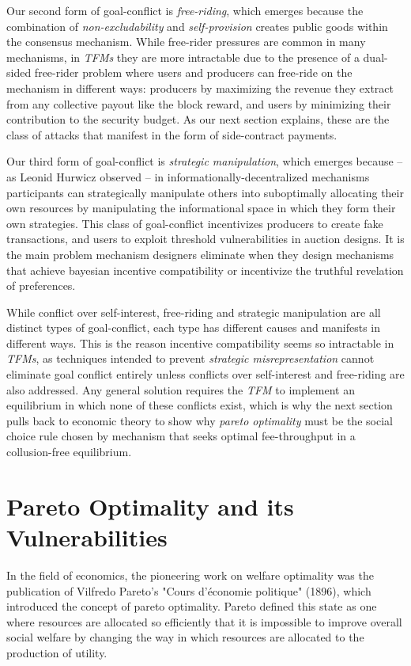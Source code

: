 \documentclass[sigconf,anonymous]{aamas}
\begin{document}
Our second form of goal-conflict is \textit{free-riding}, which emerges because the combination of \textit{non-excludability} and \textit{self-provision} creates public goods within the consensus mechanism. While free-rider pressures are common in many mechanisms, in \textit{TFMs} they are more intractable due to the presence of a dual-sided free-rider problem where users and producers can free-ride on the mechanism in different ways: producers by maximizing the revenue they extract from any collective payout like the block reward, and users by minimizing their contribution to the security budget. As our next section explains, these are the class of attacks that manifest in the form of side-contract payments.

Our third form of goal-conflict is \textit{strategic manipulation}, which emerges because -- as Leonid Hurwicz observed -- in informationally-decentralized mechanisms participants can strategically manipulate others into suboptimally allocating their own resources by manipulating the informational space in which they form their own strategies. This class of goal-conflict incentivizes producers to create fake transactions, and users to exploit threshold vulnerabilities in auction designs. It is the main problem mechanism designers eliminate when they design mechanisms that achieve bayesian incentive compatibility or incentivize the truthful revelation of preferences.

While conflict over self-interest, free-riding and strategic manipulation are all distinct types of goal-conflict, each type has different causes and manifests in different ways. This is the reason incentive compatibility seems so intractable in \textit{TFMs}, as techniques intended to prevent \textit{strategic misrepresentation} cannot eliminate goal conflict entirely unless conflicts over self-interest and free-riding are also addressed. Any general solution requires the \textit{TFM} to implement an equilibrium in which none of these conflicts exist, which is why the next section pulls back to economic theory to show why \textit{pareto optimality} must be the social choice rule chosen by mechanism that seeks optimal fee-throughput in a collusion-free equilibrium.


\section{Pareto Optimality and its Vulnerabilities\label{sec::section1p2}}

In the field of economics, the pioneering work on welfare optimality was the publication of Vilfredo Pareto’s "Cours d'économie politique" (1896), which introduced the concept of pareto optimality. Pareto defined this state as one where resources are allocated so efficiently that it is impossible to improve overall social welfare by changing the way in which resources are allocated to the production of utility.
\end{document}
